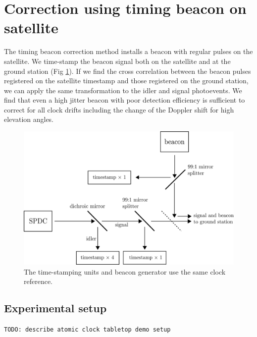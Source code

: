 \section{Correction using timing beacon on satellite}
The timing beacon correction method installs a beacon with regular pulses on the satellite. We time-stamp the beacon signal both on the satellite and at the ground station (Fig \ref{fig:beacon}). If we find the cross correlation between the beacon pulses registered on the satellite timestamp and those registered on the ground station, we can apply the same transformation to the idler and signal photoevents. We find that even a high jitter beacon with poor detection efficiency is sufficient to correct for all clock drifts including the change of the Doppler shift for high elevation angles.

\begin{figure}[ht!]
	\includegraphics[width=0.97\linewidth]{assets/beacon}
	\caption{The time-stamping units and beacon generator use the same clock reference.}
	\label{fig:beacon}
\end{figure}

\subsection{Experimental setup}
\texttt{TODO: describe atomic clock tabletop demo setup}

